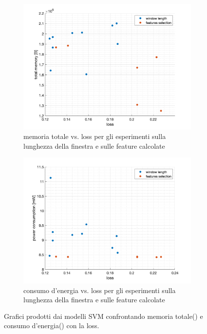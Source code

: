 \begin{figure}[!htb]
    \centering
    \begin{subfigure}{.45\textwidth}
        \includegraphics[width=\textwidth]{figure/svm_memory_loss.png}
        \caption{memoria totale vs. loss per gli esperimenti sulla lunghezza della finestra e sulle feature calcolate}
        \label{fig:performance-svm-hexi:svm-memory-loss}
    \end{subfigure}
    \begin{subfigure}{.45\textwidth}
        \includegraphics[width=\textwidth]{figure/svm_power_loss.png}
        \caption{consumo d'energia vs. loss per gli esperimenti sulla lunghezza della finestra e sulle feature calcolate}
        \label{fig:performance-svm-hexi:svm-power-loss}
    \end{subfigure}
    \caption{Grafici prodotti dai modelli SVM confrontando memoria totale() e consumo d'energia() con la loss.}
    \label{fig:performance-svm-hexi}
\end{figure}

